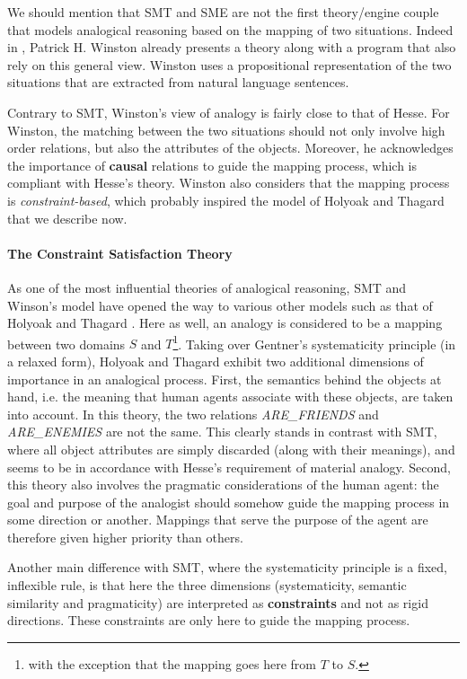We should mention that SMT and SME are not the first theory/engine couple that
models analogical reasoning based on the mapping of two situations. Indeed in
\cite{Win80}, Patrick H. Winston already presents a theory along with a
program that also rely on this general view. Winston uses a propositional
representation of the two situations that are extracted from natural language
sentences.

Contrary to SMT, Winston's view of analogy is fairly close to that of Hesse.
For Winston, the matching between the two situations should not only involve
high order relations, but also the attributes of the objects. Moreover, he
acknowledges the importance of \textbf{causal} relations to guide the mapping
process, which is compliant with Hesse's theory. Winston also considers that
the mapping process is \textit{constraint-based}, which probably inspired the
model of Holyoak and Thagard that we describe now.

\paragraph{The Constraint Satisfaction Theory\\}

As one of the most influential theories of analogical reasoning, SMT and
Winson's model have opened the way to various other models such as that of
Holyoak and Thagard \cite{HolTha89}. Here as well, an analogy is considered to
be a mapping between two domains $S$ and $T$\footnote{with the exception that
the mapping goes here from $T$ to $S$.}. Taking over Gentner's systematicity
principle (in a relaxed form), Holyoak and Thagard exhibit two additional
dimensions of importance in an analogical process. First, the semantics behind
the objects at hand, i.e.  the meaning that human agents associate with these
objects, are taken into account. In this theory, the two relations
\textit{ARE\_FRIENDS} and \textit{ARE\_ENEMIES} are not the same. This clearly
stands in contrast with SMT, where all object attributes are simply discarded
(along with their meanings), and seems to be in accordance with Hesse's
requirement of material analogy. Second, this theory also involves the
pragmatic considerations of the human agent: the goal and purpose of the
analogist should somehow guide the mapping process in some direction or
another. Mappings that serve the purpose of the agent are therefore given
higher priority than others.

Another main difference with SMT, where the systematicity principle is a fixed,
inflexible rule, is that here the three dimensions (systematicity, semantic
similarity and pragmaticity) are interpreted as \textbf{constraints} and not as
rigid directions. These constraints are only here to guide the mapping process.


